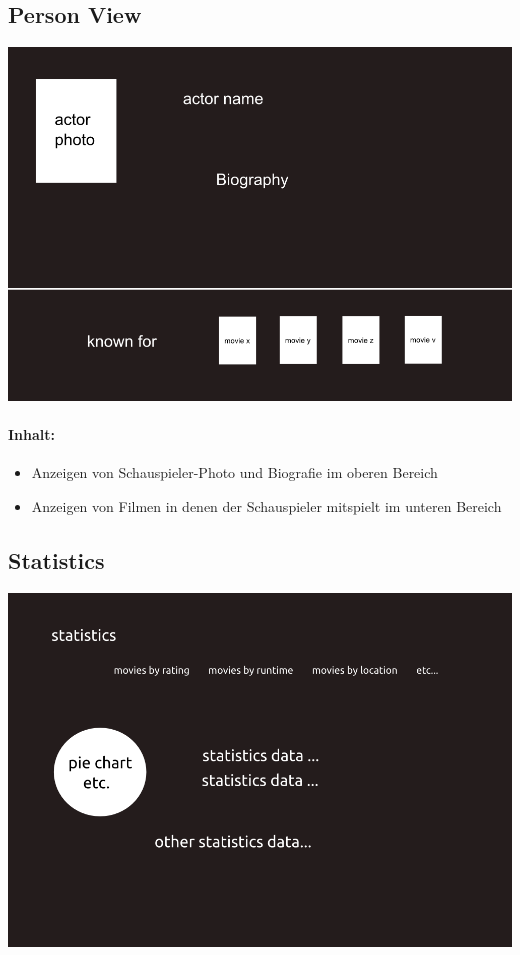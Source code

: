 \subsection{Person View}
\includegraphics[width=\textwidth]{../pics/actorview}
\paragraph{Inhalt:}
\begin{itemize}
    \item Anzeigen von Schauspieler-Photo und Biografie im oberen Bereich
    \item Anzeigen von Filmen in denen der Schauspieler mitspielt im unteren Bereich
\end{itemize}

\subsection{Statistics}
\includegraphics[width=\textwidth]{../pics/statistics}
